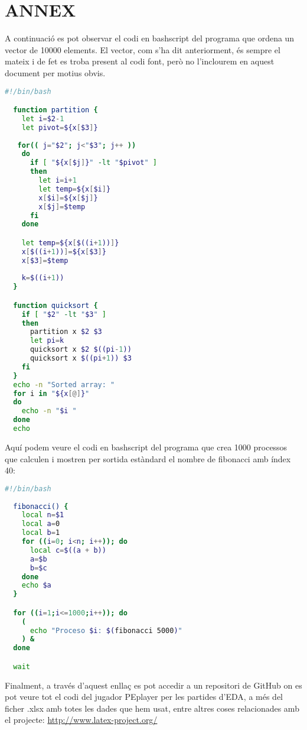 \documentclass[12pt]{article}
\begin{document}
\newpage
\section*{ANNEX}

\label{ANNEX}

A continuació es pot observar el codi en bashscript del programa que ordena un vector de 10000 elements. El vector,
com s'ha dit anteriorment, és sempre el mateix i de fet es troba present al codi font, però no l'inclourem en aquest
document per motius obvis.
\begin{lstlisting}[language=Bash, caption="Programa en bashscript: Ordenació d'un vector de 10000 elements"]
  #!/bin/bash

  function partition {
    let i=$2-1
    let pivot=${x[$3]}
  
   for(( j="$2"; j<"$3"; j++ ))
    do
      if [ "${x[$j]}" -lt "$pivot" ]
      then
        let i=i+1
        let temp=${x[$i]}
        x[$i]=${x[$j]}
        x[$j]=$temp
      fi
    done

    let temp=${x[$((i+1))]}
    x[$((i+1))]=${x[$3]}
    x[$3]=$temp
  
    k=$((i+1))
  }

  function quicksort {
    if [ "$2" -lt "$3" ]
    then
      partition x $2 $3   
      let pi=k
      quicksort x $2 $((pi-1))
      quicksort x $((pi+1)) $3
    fi 
  }
  echo -n "Sorted array: "
  for i in "${x[@]}"
  do
    echo -n "$i "
  done
  echo
\end{lstlisting}

\newpage

Aquí podem veure el codi en bashscript del programa que crea 1000 processos que calculen i mostren per sortida estàndard 
el nombre de fibonacci amb índex 40:

\begin{lstlisting}[language=Bash, caption="Programa en bashscript: Gestió de processos"]
  #!/bin/bash
  
  fibonacci() {
    local n=$1
    local a=0
    local b=1
    for ((i=0; i<n; i++)); do
      local c=$((a + b))
      a=$b
      b=$c
    done
    echo $a
  }

  for ((i=1;i<=1000;i++)); do
    (
      echo "Proceso $i: $(fibonacci 5000)"
    ) &
  done

  wait

\end{lstlisting}

\vspace{5mm} %
Finalment, a través d'aquest enllaç es pot accedir a un repositori de GitHub on es pot veure tot el codi del jugador PEplayer
per les partides d'EDA, a més del ficher .xlsx amb totes les dades que hem usat, entre altres coses relacionades amb el projecte:
\url{http://www.latex-project.org/}
\end{document}
